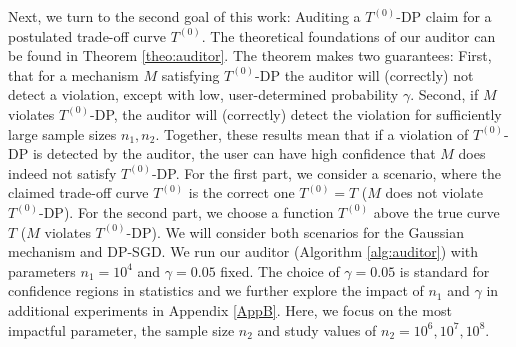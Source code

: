Next, we turn to the second goal of this work: Auditing a $T^{(0)}$-DP claim for a postulated trade-off curve $T^{(0)}$. 
The theoretical foundations of our auditor can be found in Theorem \ref{theo:auditor}. The theorem makes two guarantees: First, that for a mechanism $M$ satisfying $T^{(0)}$-DP the auditor will (correctly) not detect a violation, except with low, user-determined probability $\gamma$. Second, if $M$ violates  $T^{(0)}$-DP, the auditor will (correctly) detect the violation for sufficiently large sample sizes $n_1,n_2$. Together, these results mean that if a violation of $T^{(0)}$-DP is detected by the auditor, the user can have high confidence that $M$ does indeed not satisfy $T^{(0)}$-DP. 
For the first part, we consider a scenario, where the claimed trade-off curve $T^{(0)}$ is the correct one $T^{(0)}=T$ ($M$ does not violate $T^{(0)}$-DP). For the second part, we choose a function $T^{(0)}$ above the true curve $T$ ($M$ violates $T^{(0)}$-DP). We will consider both scenarios for the Gaussian mechanism and DP-SGD.
We run our auditor (Algorithm \ref{alg:auditor}) with parameters $n_1=10^4$ and $\gamma=0.05$ fixed. The choice of $\gamma=0.05$ is standard for confidence regions in statistics and we further explore the impact of $n_1$ and $\gamma$ in additional experiments in Appendix \ref{AppB}. Here, we focus on the most impactful parameter, the sample size $n_2$ and study values of  $n_2 = 10^6,10^7,10^8$. \\
